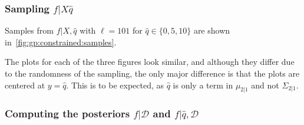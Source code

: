 \subsubsection{Sampling $f | X \hat{q}$}

Samples from $f | X, \hat{q}$ with $\ell = 101$
for $\hat{q} \in \{ 0, 5, 10 \}$ are shown in~\cref{fig:gp:constrained:samples}.

The plots for each of the three figures look similar,
and although they differ due to the randomness of the sampling,
the only major difference is that the plots are centered at
$y = \hat{q}$.
This is to be expected, as $\hat{q}$ is only a term
in $\mu_{2|1}$ and not $\Sigma_{2|1}$.

\subsubsection{
  Computing the posteriors
  $f | \mathcal{D}$ and
  $f | \hat{q}, \mathcal{D}$
}

